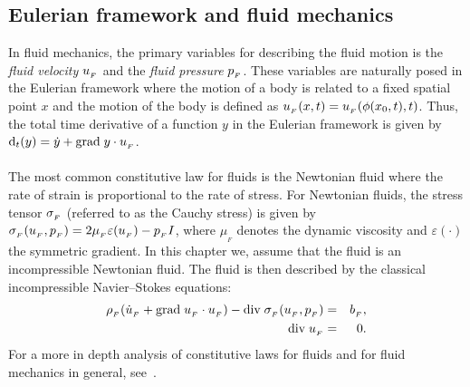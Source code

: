 \subsection{Eulerian framework and fluid mechanics}
\label{selim:sec:fluid}
In fluid mechanics, the primary variables for describing the fluid
motion is the \emph{fluid velocity} $u_{_{F}}$ and the \emph{fluid
  pressure} $p_{_{F}}$. These variables are naturally posed in the Eulerian
framework where the motion of a body is related to a fixed spatial
point $x$ and the motion of the body is defined as $u_{_{F}}(x,t) =
u_{_{F}}(\phi(x_0,t),t)$. Thus, the total time derivative of a function $y$
in the Eulerian framework is given by $\textrm{d}_t(y) = \dot{y} +
\textrm{grad}\;y\cdot u_{_{F}}$.
\\\\
The most common constitutive law for fluids is the Newtonian fluid
where the rate of strain is proportional to the rate of stress. For
Newtonian fluids, the stress tensor $\sigma_{_{F}}$ (referred to as the
Cauchy stress) is given by $\sigma_{_{F}}(u_{_{F}}, p_{_{F}}) = 2\mu_{_{F}}\varepsilon (u_{_{F}}) -
p_{_{F}} I$, where $\mu_{_{F}}$ denotes the dynamic viscosity and
$\varepsilon(\cdot)$ the symmetric gradient. In this chapter we,
assume that the fluid is an incompressible Newtonian fluid. The fluid
is then described by the classical incompressible Navier--Stokes
equations:
\begin{eqnarray}
  \label{selim:eq:NSmom}
      \rho_{_{F}}(\dot{u}_{_{F}} + \textrm{grad}\;u_{_{F}}\cdot u_{_{F}})- \textrm{div}\;
      \sigma_{_{F}}(u_{_{F}}, p_{_{F}}) &=& b_{_{F}},\\
  \label{selim:eq:NScon}
      \textrm{div}\; u_{_{F}} &=& 0.
\end{eqnarray}
For a more in depth analysis of constitutive laws for fluids and for
fluid mechanics in general, see~\cite{Batchelor1967,Panton1984,
  WeltyWicksEtAl2001}.

